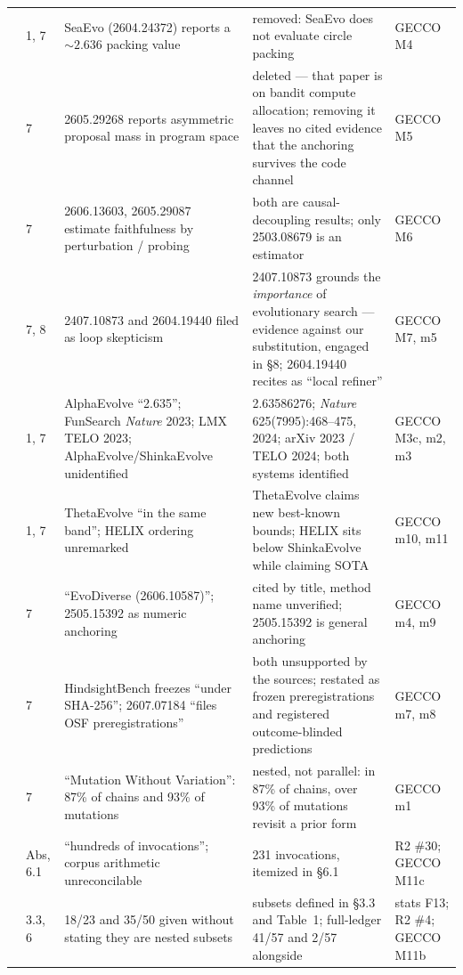 \documentclass[11pt]{article}
\begin{document}
\begin{longtable}{L{4mm}L{10mm}L{41mm}L{64mm}L{18mm}}
 & 1, 7 & SeaEvo (2604.24372) reports a ${\sim}2.636$ packing value & removed: SeaEvo does not evaluate circle packing & GECCO M4 \\
 & 7 & 2605.29268 reports asymmetric proposal mass in program space & deleted --- that paper is on bandit compute allocation; removing it leaves no cited evidence that the anchoring survives the code channel & GECCO M5 \\
 & 7 & 2606.13603, 2605.29087 estimate faithfulness by perturbation / probing & both are causal-decoupling results; only 2503.08679 is an estimator & GECCO M6 \\
 & 7, 8 & 2407.10873 and 2604.19440 filed as loop skepticism & 2407.10873 grounds the \textit{importance} of evolutionary search --- evidence against our substitution, engaged in \S8; 2604.19440 recites as ``local refiner'' & GECCO M7, m5 \\
 & 1, 7 & AlphaEvolve ``2.635''; FunSearch \textit{Nature} 2023; LMX TELO 2023; AlphaEvolve/ShinkaEvolve unidentified & 2.63586276; \textit{Nature} 625(7995):468--475, 2024; arXiv 2023 / TELO 2024; both systems identified & GECCO M3c, m2, m3 \\
 & 1, 7 & ThetaEvolve ``in the same band''; HELIX ordering unremarked & ThetaEvolve claims new best-known bounds; HELIX sits below ShinkaEvolve while claiming SOTA & GECCO m10, m11 \\
 & 7 & ``EvoDiverse (2606.10587)''; 2505.15392 as numeric anchoring & cited by title, method name unverified; 2505.15392 is general anchoring & GECCO m4, m9 \\
 & 7 & HindsightBench freezes ``under SHA-256''; 2607.07184 ``files OSF preregistrations'' & both unsupported by the sources; restated as frozen preregistrations and registered outcome-blinded predictions & GECCO m7, m8 \\
 & 7 & ``Mutation Without Variation'': 87\% of chains and 93\% of mutations & nested, not parallel: in 87\% of chains, over 93\% of mutations revisit a prior form & GECCO m1 \\
 & Abs, 6.1 & ``hundreds of invocations''; corpus arithmetic unreconcilable & 231 invocations, itemized in \S6.1 & R2 \#30; GECCO M11c \\
 & 3.3, 6 & 18/23 and 35/50 given without stating they are nested subsets & subsets defined in \S3.3 and Table~1; full-ledger 41/57 and 2/57 alongside & stats F13; R2 \#4; GECCO M11b \\

\end{longtable}
\end{document}
